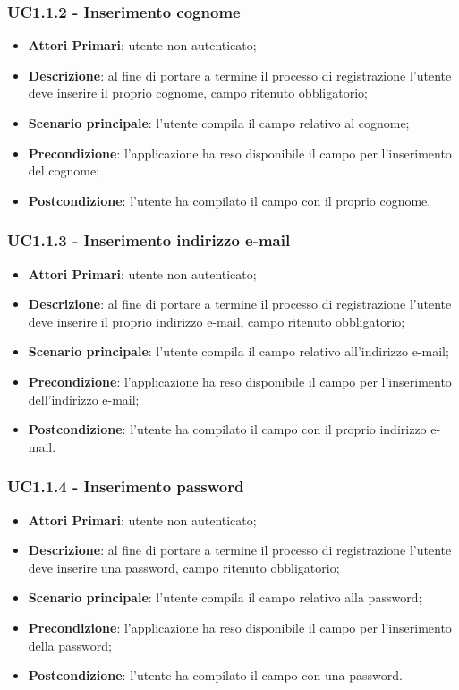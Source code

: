 \subsubsection{UC1.1.2 - Inserimento cognome}
\begin{itemize}
	\item \textbf{Attori Primari}: utente non autenticato;
	\item \textbf{Descrizione}: al fine di portare a termine il processo di registrazione l'utente deve inserire il proprio cognome, campo ritenuto obbligatorio;
	\item \textbf{Scenario principale}: l'utente compila il campo relativo al cognome;	
	\item \textbf{Precondizione}: l'applicazione ha reso disponibile il campo per l'inserimento del cognome;
	\item \textbf{Postcondizione}: l'utente ha compilato il campo con il proprio cognome.	
\end{itemize}
\subsubsection{UC1.1.3 - Inserimento indirizzo e-mail}
\begin{itemize}
	\item \textbf{Attori Primari}: utente non autenticato;
	\item \textbf{Descrizione}: al fine di portare a termine il processo di registrazione l'utente deve inserire il proprio indirizzo e-mail, campo ritenuto obbligatorio;
	\item \textbf{Scenario principale}: l'utente compila il campo relativo all'indirizzo e-mail;	
	\item \textbf{Precondizione}: l'applicazione ha reso disponibile il campo per l'inserimento dell'indirizzo e-mail;
	\item \textbf{Postcondizione}: l'utente ha compilato il campo con il proprio indirizzo e-mail.
\end{itemize}
\subsubsection{UC1.1.4 - Inserimento password}
\begin{itemize}
	\item \textbf{Attori Primari}: utente non autenticato;
	\item \textbf{Descrizione}: al fine di portare a termine il processo di registrazione l'utente deve inserire una password, campo ritenuto obbligatorio;
	\item \textbf{Scenario principale}: l'utente compila il campo relativo alla password;	
	\item \textbf{Precondizione}: l'applicazione ha reso disponibile il campo per l'inserimento della password;
	\item \textbf{Postcondizione}: l'utente ha compilato il campo con una password.
\end{itemize}
